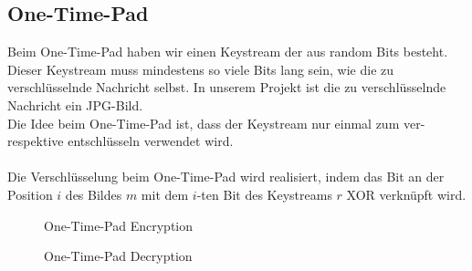 \documentclass[paper=a4,fontsize=12pt]{scrartcl}
\begin{document}
\subsection{One-Time-Pad}
Beim One-Time-Pad haben wir einen Keystream der aus random Bits besteht.
Dieser Keystream muss mindestens so viele Bits lang sein, wie die zu verschlüsselnde Nachricht selbst.
In unserem Projekt ist die zu verschlüsselnde Nachricht ein JPG-Bild. \\
Die Idee beim One-Time-Pad ist, dass der Keystream nur einmal zum ver- respektive entschlüsseln verwendet wird. \\ \\
Die Verschlüsselung beim One-Time-Pad wird realisiert, 
indem das Bit an der Position $i$ des Bildes $m$ mit dem $i$-ten Bit des Keystreams $r$ XOR verknüpft wird.

\begin{figure}[H] 
	\centering
	\caption[One Time Pad Encryption]{One-Time-Pad Encryption}  
	\label{One-Time-Pad Encryption}  
\end{figure}
\begin{figure}[H] 
	\centering
	\caption[One Time Pad Decryption]{One-Time-Pad Decryption}  
	\label{One-Time-Pad-enc} 
\end{figure}
\end{document}
